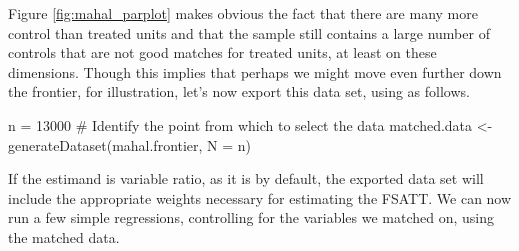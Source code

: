 \documentclass[nojss]{jss}
\begin{document}
Figure \ref{fig:mahal_parplot} makes obvious the fact that there are many more control than 
treated units and that the sample still contains a large number of controls that are
not good matches for treated units, at least on these dimensions. Though this implies that
perhaps we might move even further down the frontier, for illustration, let's now export
this data set, using  as follows.

\begin{CodeChunk}
\begin{CodeInput}
n = 13000 # Identify the point from which to select the data
matched.data <- generateDataset(mahal.frontier, N = n)
\end{CodeInput}
\end{CodeChunk}

If the estimand is variable ratio, as it is by default, the exported
data set will include the appropriate weights necessary for estimating
the FSATT. We can now run a few simple regressions, controlling for
the variables we matched on, using the matched data.
\end{document}
